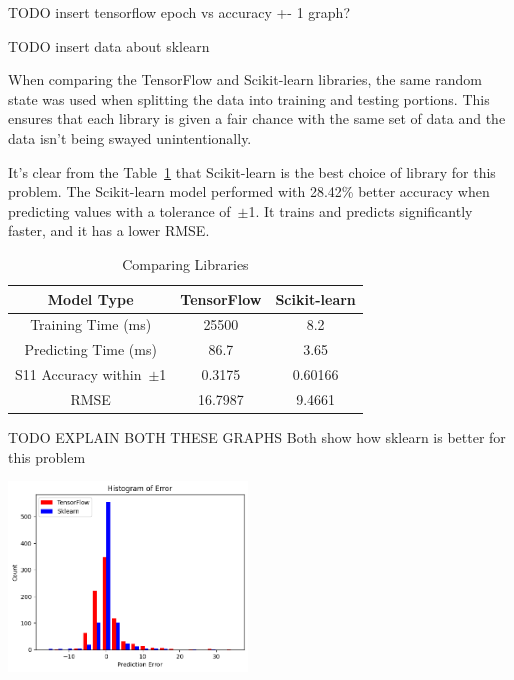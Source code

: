 \documentclass[lettersize,journal]{IEEEtran}
\newenvironment{Figure}
    {\par\medskip\noindent\minipage{\linewidth}}
    {\endminipage\par\medskip}
\begin{document}
TODO insert tensorflow epoch vs accuracy +- 1 graph? 

TODO insert data about sklearn 

When comparing the TensorFlow and Scikit-learn libraries, the same random state was used when splitting the data into training and testing portions. This ensures that each library is given a fair chance with the same set of data and the data isn't being swayed unintentionally. 

It's clear from the Table~\ref{comparing_libraries} that Scikit-learn is the best choice of library for this problem. The Scikit-learn model performed with 28.42\% better accuracy when predicting values with a tolerance of~$\pm$1. It trains and predicts significantly faster, and it has a lower RMSE.

\begin{table}[h]
\caption{Comparing Libraries}
\begin{center}
\begin{tabular}{ |c|c|c| }
    \hline
    Model Type & TensorFlow & Scikit-learn \\ 
    \hline
    Training Time (ms) & 25500 & 8.2 \\  
    \hline
    Predicting Time (ms) & 86.7 & 3.65 \\
    \hline
    S11 Accuracy within~$\pm$1 & 0.3175 & 0.60166 \\
    \hline
    RMSE & 16.7987 & 9.4661 \\
    \hline
\end{tabular}
\end{center}
\label{comparing_libraries}
\end{table}

TODO EXPLAIN BOTH THESE GRAPHS
Both show how sklearn is better for this problem

\begin{Figure}
    \centering
    \includegraphics[width=2.5in]{histogram}
    \label{historgram_of_error}
\end{Figure}
\end{document}
